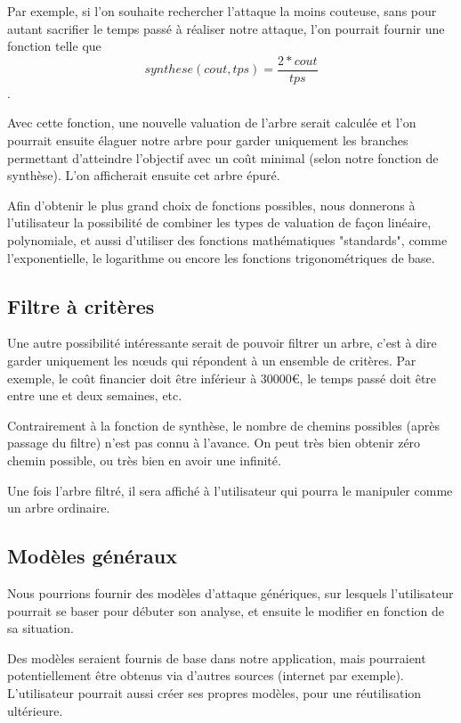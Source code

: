         Par exemple, si l'on souhaite rechercher l'attaque la moins couteuse, sans pour autant sacrifier le temps passé à réaliser notre attaque, l'on pourrait fournir une fonction telle que \[ synthese(cout, tps) = \frac{2*cout}{tps} \]. 

        Avec cette fonction, une nouvelle valuation de l'arbre serait calculée et l'on pourrait ensuite élaguer notre arbre pour garder uniquement les branches permettant d'atteindre l'objectif avec un coût minimal (selon notre fonction de synthèse). L'on afficherait ensuite cet arbre épuré.

        Afin d'obtenir le plus grand choix de fonctions possibles, nous donnerons à l'utilisateur la possibilité de combiner les types de valuation de façon linéaire, polynomiale, et aussi d'utiliser des fonctions mathématiques "standards", comme l'exponentielle, le logarithme ou encore les fonctions trigonométriques de base.

    \subsection{Filtre à critères}
        \label{sec:filtre}

        Une autre possibilité intéressante serait de pouvoir filtrer un arbre, c'est à dire garder uniquement les nœuds qui répondent à un ensemble de critères. Par exemple, le coût financier doit être inférieur à 30000\euro{}, le temps passé doit être entre une et deux semaines, etc.

        Contrairement à la fonction de synthèse, le nombre de chemins possibles (après passage du filtre) n'est pas connu à l'avance. On peut très bien obtenir zéro chemin possible, ou très bien en avoir une infinité.

        Une fois l'arbre filtré, il sera affiché à l'utilisateur qui pourra le manipuler comme un arbre ordinaire.

    \subsection{Modèles généraux}
        \label{sec:modele}

        Nous pourrions fournir des modèles d'attaque génériques, sur lesquels l'utilisateur pourrait se baser pour débuter son analyse, et ensuite le modifier en fonction de sa situation.

        Des modèles seraient fournis de base dans notre application, mais pourraient potentiellement être obtenus via d'autres sources (internet par exemple). L'utilisateur pourrait aussi créer ses propres modèles, pour une réutilisation ultérieure.


